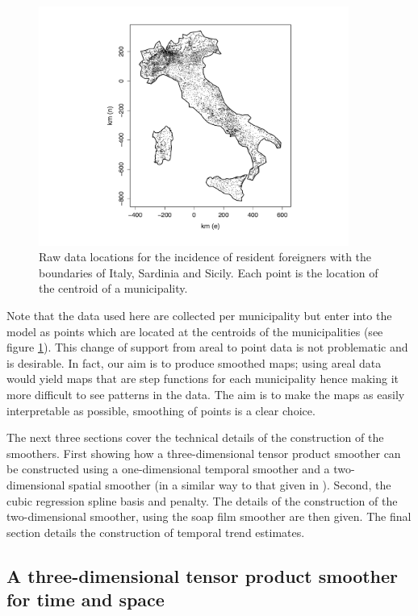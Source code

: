 \begin{figure}[tbp]
	\centering
		\includegraphics[width=4in]{it/pointmap.pdf}
	\caption{Raw data locations for the incidence of resident foreigners with the boundaries of Italy, Sardinia and Sicily. Each point is the location of the centroid of a municipality.}
	\label{pointmap}
\end{figure}

Note that the data used here are collected per municipality but enter into the model as points which are located at the centroids of the municipalities (see figure \ref{pointmap}). This change of support from areal to point data is not problematic and is desirable. In fact, our aim is to produce smoothed maps; using areal data would yield maps that are step functions for each municipality hence making it more difficult to see patterns in the data. The aim is to make the maps as easily interpretable as possible, smoothing of points is a clear choice.

The next three sections cover the technical details of the construction of the smoothers. First showing how a three-dimensional tensor product smoother can be constructed using a one-dimensional temporal smoother and a two-dimensional spatial smoother (in a similar way to that given in ). Second, the cubic regression spline basis and penalty. The details of the construction of the two-dimensional smoother, using the soap film smoother are then given. The final section details the construction of temporal trend estimates.

\subsection{A three-dimensional tensor product smoother for time and space \label{3D}}

